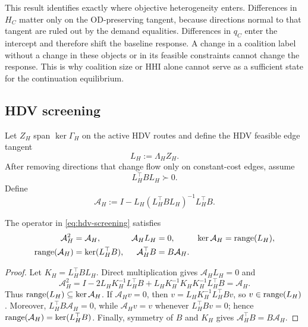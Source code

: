 This result identifies exactly where objective heterogeneity enters. Differences in $H_C$ matter only on the OD-preserving tangent, because directions normal to that tangent are ruled out by the demand equalities. Differences in $q_C$ enter the intercept and therefore shift the baseline response. A change in a coalition label without a change in these objects or in its feasible constraints cannot change the response. This is why coalition size or HHI alone cannot serve as a sufficient state for the continuation equilibrium.

\subsection{HDV screening}\label{sec:hdv_screening}

Let $Z_H$ span $\ker\Gamma_H$ on the active HDV routes and define the HDV feasible edge tangent
\begin{equation}\label{eq:hdv-tangent}
 L_H:=\Lambda_HZ_H.
\end{equation}
After removing directions that change flow only on constant-cost edges, assume
\begin{equation}\label{eq:hdv-tangent-pd}
 L_H^\top BL_H\succ0.
\end{equation}
Define
\begin{equation}\label{eq:hdv-screening}
 \mathcal A_H:=I-L_H(L_H^\top BL_H)^{-1}L_H^\top B.
\end{equation}

\begin{lemma}\label{lem:screening}
The operator in \eqref{eq:hdv-screening} satisfies
\begin{align*}
 \mathcal A_H^2&=\mathcal A_H, &
 \mathcal A_HL_H&=0, &
 \ker\mathcal A_H&=\operatorname{range}(L_H),\\
 \operatorname{range}(\mathcal A_H)&=\ker(L_H^\top B), &
 \mathcal A_H^\top B&=B\mathcal A_H.&&
\end{align*}
\end{lemma}

\begin{proof}
Let $K_H=L_H^\top BL_H$. Direct multiplication gives $\mathcal A_HL_H=0$ and
\[
\mathcal A_H^2=I-2L_HK_H^{-1}L_H^\top B+L_HK_H^{-1}K_HK_H^{-1}L_H^\top B=\mathcal A_H.
\]
Thus $\operatorname{range}(L_H)\subseteq\ker\mathcal A_H$. If $\mathcal A_Hv=0$, then $v=L_HK_H^{-1}L_H^\top Bv$, so $v\in\operatorname{range}(L_H)$. Moreover, $L_H^\top B\mathcal A_H=0$, while $\mathcal A_Hv=v$ whenever $L_H^\top Bv=0$; hence $\operatorname{range}(\mathcal A_H)=\ker(L_H^\top B)$. Finally, symmetry of $B$ and $K_H$ gives $\mathcal A_H^\top B=B\mathcal A_H$.
\end{proof}

